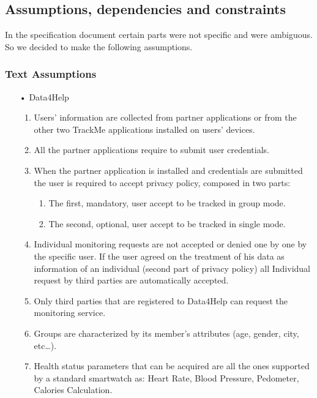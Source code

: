 \subsection{Assumptions, dependencies and constraints}
In the specification document certain parts were not specific and were ambiguous. So we decided to make the following assumptions.

\subsubsection{Text Assumptions}
\begin{enumerate}

\item[•] {\Large Data4Help}
	\begin{enumerate}
	\item Users' information are collected from partner applications or from the other two TrackMe applications installed on users' devices.
	\item All the partner applications require to submit user credentials.
	\item When the partner application is installed and credentials are submitted
	the user is required to accept privacy policy, composed in two parts:
		\begin{enumerate}
		\item The first, mandatory, user accept to be tracked in group mode.
		\item The second, optional, user accept to be tracked in single mode.
		\end{enumerate}
	\item Individual monitoring requests are not accepted or denied one by one by the specific user. If the user agreed on the treatment of his data as information of an individual (second part of privacy policy) all Individual request by third parties are automatically accepted.	
	\item Only third parties that are registered to Data4Help can request the monitoring service.
	\item Groups are characterized by its member’s attributes (age, gender, city, etc…).
	\item Health status parameters that can be acquired are all the ones supported by a standard smartwatch as: Heart Rate, Blood Pressure, Pedometer, Calories Calculation.
	\end{enumerate}
	

\end{enumerate}
